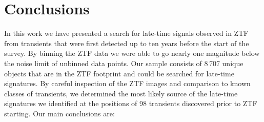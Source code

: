 \documentclass[a4paper,oneside,12pt, class=Latex/Classes/PhDthesisPSnPDF, crop=false]{standalone}
\begin{document}
\section{Conclusions}
\label{Pre-ZTF_conclusions}
In this work we have presented a search for late-time signals observed in ZTF from transients that were first detected up to ten years before the start of the survey. By binning the ZTF data we were able to go nearly one magnitude below the noise limit of unbinned data points. Our sample consists of 8\,707 unique objects that are in the ZTF footprint and could be searched for late-time signatures. By careful inspection of the ZTF images and comparison to known classes of transients, we determined the most likely source of the late-time signatures we identified at the positions of 98 transients discovered prior to ZTF starting. Our main conclusions are:
\end{document}
